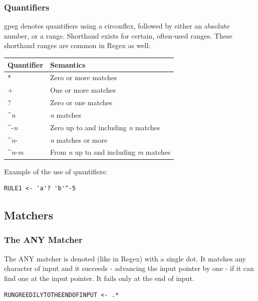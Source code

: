 \subsubsection{Quantifiers}

gpeg denotes quantifiers using a circonflex, followed by either
an absolute number, or a range. Shorthand exists for certain, often-used
ranges. These shorthand ranges are common in Regex as well:

\begin{center}
\label{tab:naig_quantifiers}
\begin{longtable}{ll}
\textbf{Quantifier} & \textbf{Semantics} \\
\endhead
* & Zero or more matches \\
+ & One or more matches \\
? & Zero or one matches \\
\^{}\textit{n} & \textit{n} matches \\
\^{}-\textit{n} & Zero up to and including \textit{n} matches \\
\^{}\textit{n}- & \textit{n} matches or more \\
\^{}\textit{n}-\textit{m} & From \textit{n} up to and including \textit{m} matches \\
\end{longtable}
\end{center}
 
Example of the use of quantifiers:
\begin{myquote}
\begin{verbatim}
RULE1 <- 'a'? 'b'^-5
\end{verbatim}
\end{myquote}

\subsection{Matchers}

\subsubsection{The ANY Matcher}

The ANY matcher is denoted (like in Regex) with a single dot.
It matches any character of input and it succeeds - advancing the input
pointer by one - if it can find one at the input pointer. It fails only
at the end of input.

\begin{myquote}
\begin{verbatim}
RUNGREEDILYTOTHEENDOFINPUT <- .*
\end{verbatim}
\end{myquote}

